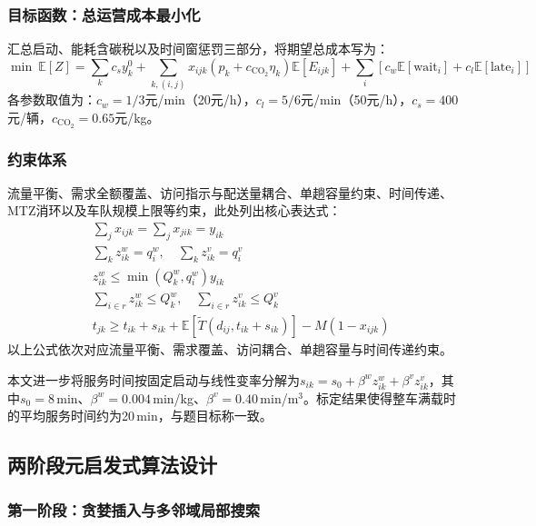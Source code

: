 \documentclass[12pt,a4paper]{article}
\begin{document}
\subsubsection{目标函数：总运营成本最小化}

汇总启动、能耗含碳税以及时间窗惩罚三部分，将期望总成本写为：
\begin{equation}
\min\ \mathbb{E}[Z]=\sum_{k}c_s y_k^0+\sum_{k,(i,j)}x_{ijk}(p_k+c_{\mathrm{CO_2}}\eta_k)\mathbb{E}[E_{ijk}]
+\sum_{i}\left[c_w\mathbb{E}[\text{wait}_i]+c_l\mathbb{E}[\text{late}_i]\right]
\end{equation}
各参数取值为：$c_w=1/3$元/min（20元/h），$c_l=5/6$元/min（50元/h），$c_s=400$元/辆，$c_{\mathrm{CO_2}}=0.65$元/kg。

\subsubsection{约束体系}

流量平衡、需求全额覆盖、访问指示与配送量耦合、单趟容量约束、时间传递、MTZ消环以及车队规模上限等约束，此处列出核心表达式：
\begin{align}
    & \sum_j x_{ijk} = \sum_j x_{jik} = y_{ik}                                     \label{eq:flow-balance} \\[1ex]
    & \sum_{k}z_{ik}^w = q_i^w, \quad \sum_{k}z_{ik}^v = q_i^v                    \label{eq:demand-cover} \\[1ex]
    & z_{ik}^w \le \min(Q_k^w, q_i^w) y_{ik}                                       \label{eq:visit-couple} \\[1ex]
    & \sum_{i \in r} z_{ik}^w \le Q_k^w, \quad \sum_{i \in r} z_{ik}^v \le Q_k^v   \label{eq:capacity}     \\[1ex]
    & t_{jk} \ge t_{ik} + s_{ik} + \mathbb{E}[\tilde T(d_{ij}, t_{ik} + s_{ik})] - M(1 - x_{ijk}) \label{eq:time-prop}
\end{align}
以上公式依次对应流量平衡、需求覆盖、访问耦合、单趟容量与时间传递约束。

本文进一步将服务时间按固定启动与线性变率分解为$s_{ik}=s_0+\beta^w z_{ik}^w+\beta^v z_{ik}^v$，其中$s_0=8$\,min、$\beta^w=0.004$\,min/kg、$\beta^v=0.40$\,min/m$^3$。标定结果使得整车满载时的平均服务时间约为20\,min，与题目标称一致。

\subsection{两阶段元启发式算法设计}

\subsubsection{第一阶段：贪婪插入与多邻域局部搜索}
\end{document}
